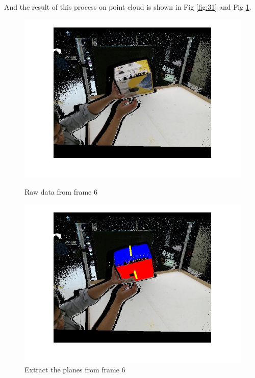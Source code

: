 \documentclass[10pt,a4paper]{article}
\begin{document}
And the result of this process on point cloud is shown in Fig \ref{fig:31} and Fig \ref{fig:32}.

\vspace{-10pt}
\hspace{-40pt}
\begin{figure}[!h]
	\hspace{-50pt}
	\begin{minipage}[t]{0.74 \linewidth}
		
		\centering
		\includegraphics[scale=0.3]{planeandnormalori.jpg}
		\caption{ \small Raw data from frame 6}
		\label{fig:31}
	\end{minipage}
	\hspace{-100pt}
	\begin{minipage}[t]{0.74 \linewidth}
		\centering
		\includegraphics[scale=0.3]{planeandnormal.jpg}
		\caption{ \small Extract the planes from frame 6}
		\label{fig:32}
	\end{minipage}
\end{figure}
\end{document}
